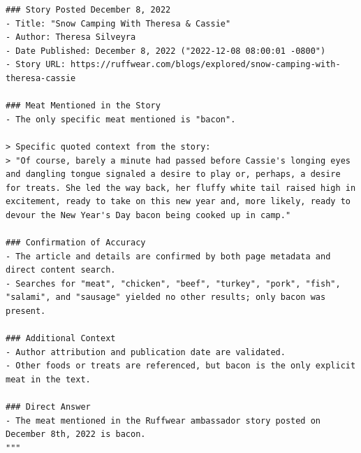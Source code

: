 \begin{tcolorbox}[
        colback=gray!5!white,
        colframe=gray!50!black,
        title=Smolagent + SupervisorAgent,
        floatplacement=Hp,
        breakable  %
    ]
\begin{itemize}[leftmargin=1em]
\begin{lstlisting}[basicstyle=\ttfamily\small, breaklines=true, columns=fixed, breakindent=0pt, xleftmargin=0pt, gobble=0]
### Story Posted December 8, 2022
- Title: "Snow Camping With Theresa & Cassie"
- Author: Theresa Silveyra
- Date Published: December 8, 2022 ("2022-12-08 08:00:01 -0800")
- Story URL: https://ruffwear.com/blogs/explored/snow-camping-with-theresa-cassie

### Meat Mentioned in the Story
- The only specific meat mentioned is "bacon".

> Specific quoted context from the story:
> "Of course, barely a minute had passed before Cassie's longing eyes and dangling tongue signaled a desire to play or, perhaps, a desire for treats. She led the way back, her fluffy white tail raised high in excitement, ready to take on this new year and, more likely, ready to devour the New Year's Day bacon being cooked up in camp."

### Confirmation of Accuracy
- The article and details are confirmed by both page metadata and direct content search.
- Searches for "meat", "chicken", "beef", "turkey", "pork", "fish", "salami", and "sausage" yielded no other results; only bacon was present.

### Additional Context
- Author attribution and publication date are validated.
- Other foods or treats are referenced, but bacon is the only explicit meat in the text.

### Direct Answer
- The meat mentioned in the Ruffwear ambassador story posted on December 8th, 2022 is bacon.
"""
\end{lstlisting}
    \end{itemize}
\end{tcolorbox}


